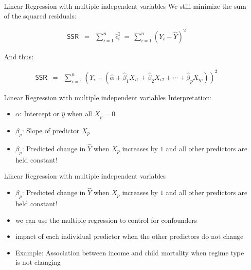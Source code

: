 \documentclass[presentation]{beamer}
\begin{document}
\begin{frame}[label={sec:org5249cdd}]{Linear Regression with multiple independent variables}
We still minimize the sum of the squared residuals:


\begin{eqnarray*}
      \textsf{SSR} & = & \sum_{i=1}^n \hat\epsilon_i^2 \ = \ \sum_{i=1}^n
                         (Y_i - \hat{Y})^2
    \end{eqnarray*}

And thus:

\begin{eqnarray*}

 \textsf{SSR} &=& \sum_{i=1}^n (Y_i - (\hat\alpha + \hat\beta_1 X_{i1} +
                         \hat\beta_2 X_{i2} + \cdots + \hat\beta_p X_{ip}))^2
    \end{eqnarray*}
\end{frame}



\begin{frame}[label={sec:org3f61f3b}]{Linear Regression with multiple independent variables}
Interpretation:

\begin{itemize}
\item \(\alpha\): Intercept or \(\hat{y}\) when all \(X_{p} = 0\)
\end{itemize}

\pause

\begin{itemize}
\item \(\beta_{p}\): Slope of predictor \(X_{p}\)
\end{itemize}

\pause

\begin{itemize}
\item \(\beta_{p}\): Predicted change in \(\hat{Y}\) when \(X_{p}\) increases by \(1\) \alert{and} all other predictors \alert{are held constant}!
\end{itemize}
\end{frame}



\begin{frame}[label={sec:orge68d71f}]{Linear Regression with multiple independent variables}
\begin{itemize}
\item \(\beta_{p}\): Predicted change in \(\hat{Y}\) when \(X_{p}\) increases by \(1\) \alert{and} all other predictors \alert{are held constant}!

\item we can use the multiple regression to \alert{control for confounders}
\end{itemize}

\pause

\begin{itemize}
\item impact of each individual predictor when the other predictors do not change

\item Example: Association between income and child mortality when regime type is not changing
\end{itemize}
\end{frame}
\end{document}
